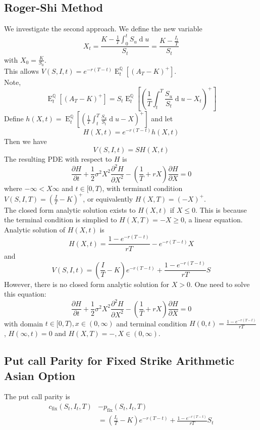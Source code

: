 \documentclass[12pt]{article}
\theoremstyle{definition}
\DeclareMathOperator{\diff}{d}
\DeclareMathOperator{\expec}{E}
\begin{document}
\subsection{Roger-Shi Method}
We investigate the second approach. We define the new variable
\[
X_t=\frac{K-\frac{1}{T}\int_0^t S_u\diff u}{S_t}=\frac{K-\frac{I_t}{T}}{S_t}
\]
with $X_0=\frac{K}{S_0}$.\\
This allows $V(S,I,t)=e^{-r(T-t)}\expec_t^{\mathbb{Q}}[(A_T-K)^{+}]$.\\
Note, 
\[
\expec_t^{\mathbb{Q}}[(A_T-K)^{+}]=S_t\expec_t^{\mathbb{Q}}[(\frac{1}{T}\int_t^T \frac{S_u}{S_t}\diff u-X_t)^{+}]
\]
Define $h(X,t)=\expec_t^{\mathbb{Q}}[(\frac{1}{T}\int_t^T \frac{S_u}{S_t}\diff u-X)^{+}]$ and let 
\[
H(X,t)=e^{-r(T-t)}h(X,t)
\]
Then we have
\[
V(S,I,t)=SH(X,t)
\]
The resulting PDE with respect to $H$ is
\[
\frac{\partial H}{\partial t}+\frac{1}{2}\sigma^2 X^2\frac{\partial^2 H}{\partial X^2}-(\frac{1}{T}+rX)\frac{\partial H}{\partial X}=0
\]
where $-\infty<X\infty$ and $t\in[0,T)$, with terminatl condition $V(S,I,T)=(\frac{I}{T}-K)^{+}$, or equivalently $H(X,T)=(-X)^{+}$.\\

The closed form analytic solution exists to $H(X,t)$ if $X\leq 0$. This is because the terminal condition is simplied to $H(X,T)=-X\geq 0$, a linear equation.\\
Analytic solution of $H(X,t)$ is
\[
H(X,t)=\frac{1-e^{-r(T-t)}}{rT}-e^{-r(T-t)}X
\]
and 
\[
V(S,I,t)=(\frac{I}{T}-K)e^{-r(T-t)}+\frac{1-e^{-r(T-t)}}{rT}S
\]
However, there is no closed form analytic solution for $X>0$. One need to solve this equation:
\[
\frac{\partial H}{\partial t}+\frac{1}{2}\sigma^2 X^2\frac{\partial^2 H}{\partial X^2}-(\frac{1}{T}+rX)\frac{\partial H}{\partial X}=0
\]
with domain $t\in[0,T), x\in(0,\infty)$ and terminal condition $H(0,t)=\frac{1-e^{-r(T-t)}}{rT}$, $H(\infty, t)=0$ and $H(X,T)=-, X\in (0,\infty)$.
\subsection{Put call Parity for Fixed Strike Arithmetic Asian Option}
The put call parity is
\begin{align*}
c_\text{fix}(S_t,I_t, T)&-p_\text{fix}(S_t,I_t,T)\\
&=(\frac{I_t}{T}-K)e^{-r(T-t)}+\frac{1-e^{-r(T-t)}}{rT}S_t
\end{align*}
\end{document}
